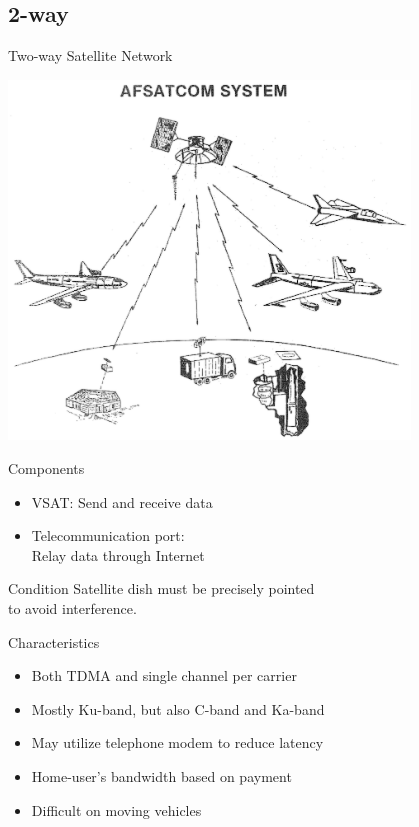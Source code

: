 \documentclass[pdf]{beamer}
\begin{document}
\subsection{2-way}
\begin{frame}{Two-way Satellite Network}
  \begin{center}
    \includegraphics[width=0.8\textwidth]{two-way.png}
  \end{center}
\end{frame}

\begin{frame}{Components}\LARGE
  \begin{itemize}
    \item VSAT: Send and receive data
    \item Telecommunication port:\\ Relay data through Internet
  \end{itemize}
\end{frame}

\begin{frame}{Condition}\LARGE
  Satellite dish must be precisely pointed\\
  to avoid interference.
\end{frame}

\begin{frame}{Characteristics}\large
  \begin{itemize}
    \item Both TDMA and single channel per carrier
    \item Mostly Ku-band, but also C-band and Ka-band
    \item May utilize telephone modem to reduce latency
    \item Home-user's bandwidth based on payment
    \item Difficult on moving vehicles
  \end{itemize}
\end{frame}
\end{document}
